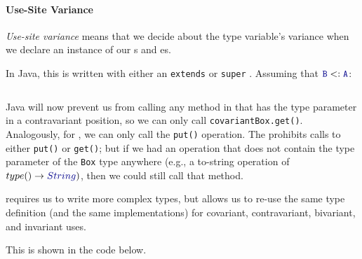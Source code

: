 \paragraph{Use-Site Variance}\label{par:Use_Site_Variance}
\begin{definition}\label{def:Use_Site_Variance}
  \emph{Use-site variance} means that we decide about the type variable's variance when we declare an instance of our s and es.
\end{definition}

In Java, this is written with either an \texttt{extends} or \texttt{super} .
Assuming that $\mathtt{\SemanticType{B}} <: \mathtt{\SemanticType{A}}$:
\inputminted[frame=lines,linenos]{scala}{./EDAP05-Concepts_Programming_Languages-Sections/Advanced_Data_Types/Code/Use_Site_Variance.java}

Java will now prevent us from calling any method in \texttt{} that has the type parameter in a contravariant position, so we can only call \texttt{covariantBox.get()}.
Analogously, for \texttt{}, we can only call the \texttt{put()} operation.
The \texttt{} prohibits calls to either \texttt{put()} or \texttt{get()}; but if we had an operation that does not contain the type parameter of the \texttt{Box} type anywhere (e.g., a to-string operation of $type () \rightarrow \SemanticType{String})$, then we could still call that method.

 requires us to write more complex types, but allows us to re-use the same type definition (and the same implementations) for covariant, contravariant, bivariant, and invariant uses.

This is shown in the code below.
\inputminted[frame=lines,linenos]{java}{./EDAP05-Concepts_Programming_Languages-Sections/Advanced_Data_Types/Code/Variant_Java_Class.java}

